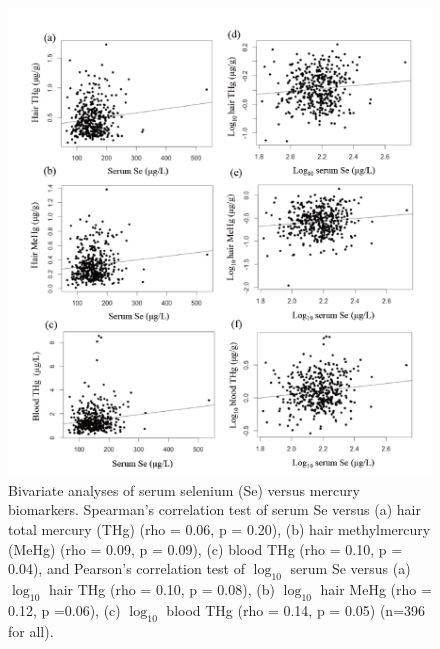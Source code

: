 \begin{figure}
  \centering
    \label{fig:Fig312}
  \includegraphics[scale=1]{Figures/Fig312.pdf}
  \caption[Bivariate analyses of serum selenium versus mercury biomarkers]{Bivariate analyses of serum selenium (Se) versus mercury biomarkers. Spearman's correlation test of serum Se versus (a) hair total mercury (THg) (rho = 0.06, p = 0.20), (b) hair methylmercury (MeHg) (rho = 0.09, p = 0.09), (c) blood THg (rho = 0.10, p = 0.04), and Pearson's correlation test of $\log_{10}$ serum Se versus (a) $\log_{10}$ hair THg (rho = 0.10, p = 0.08), (b) $\log_{10}$ hair MeHg (rho = 0.12, p =0.06), (c) $\log_{10}$ blood THg (rho = 0.14, p = 0.05) (n=396 for all).}
\end{figure}

